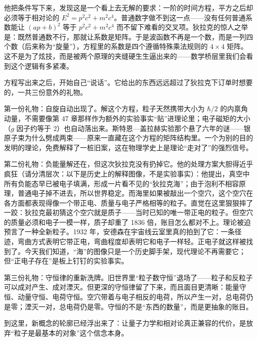 他把条件写下来，发现这是一个看上去无解的要求：一阶的时间方程，平方之后却必须等于相对论的 \(E^2=p^2c^2+m^2c^4\)。普通数字做不到这一点——没有任何普通系数能让 \((ap+b)^2\) 等于 \(p^2c^2+m^2c^4\) 而不留下难看的交叉项。狄拉克的惊人之举是：既然普通数不行，那就让系数是矩阵。于是波函数不再是一个数，而是一列四个数（后来称为“旋量”），方程里的系数是四个遵循特殊乘法规则的 \(4\times4\) 矩阵。这不是为了炫技，而是被两个原理的夹缝硬生生逼出来的——数学桥层里我们会看到这个逻辑有多紧凑。

方程写出来之后，开始自己“说话”。它给出的东西远远超过了狄拉克下订单时想要的，一共三份意外的礼物。

第一份礼物：自旋自动出现了。解这个方程，粒子天然携带大小为 \(\hbar/2\) 的内禀角动量，不需要像第 47 章那样作为额外的实验事实“贴”进理论里；电子磁矩的大小（\(g\) 因子约等于 2）也自动落出来。斯特恩—盖拉赫实验那个悬了六年的谜——银原子束为什么劈成两束——原来一直藏在这个方程的矩阵结构里。一个为别的目的发明的理论，免费解释了一桩旧案，这在物理学史上是理论“走对了”的强烈信号。

第二份礼物：负能量解还在，但这次狄拉克没有扔掉它。他的处理方案大胆得近乎疯狂（请分清层次：以下是历史上的解释图像，不是实验事实）：他提出，真空中所有负能态早已被电子填满，形成一片看不见的“狄拉克海”；由于泡利不相容原理，普通电子掉不进去，所以世界稳定。而海里如果被敲出一个空穴，这个空穴在各方面都表现得像一个带正电、质量与电子严格相等的粒子。直觉在这里狠狠摔了一跤：狄拉克最初猜这个空穴就是质子——当时已知的唯一带正电的粒子。但空穴的质量必须和电子一模一样，质子却重了 1836 倍，账目怎么都对不上。理论被迫预言了一种全新粒子。1932 年，安德森在宇宙线云室里真的拍到了它：一条径迹，弯曲方式表明它带正电，弯曲程度却表明它和电子一样轻。正电子就这样被找到了。今天我们知道，“海”的图像只是一个历史脚手架，现代理论不再需要它；但“正电子存在”是板上钉钉的实验事实。

第三份礼物：守恒律的重新洗牌。旧世界里“粒子数守恒”退场了——粒子和反粒子可以成对产生、成对湮灭。但更深的守恒律留了下来，而且面目更清晰：能量守恒、动量守恒、电荷守恒。空穴带着与电子相反的电荷，所以产生一对，总电荷仍是零；湮灭一对，总电荷仍是零。守恒的不是“东西的数量”，而是更抽象的账目。

到这里，新概念的轮廓已经浮出来了：让量子力学和相对论真正兼容的代价，是放弃“粒子是最基本的对象”这个信念本身。
